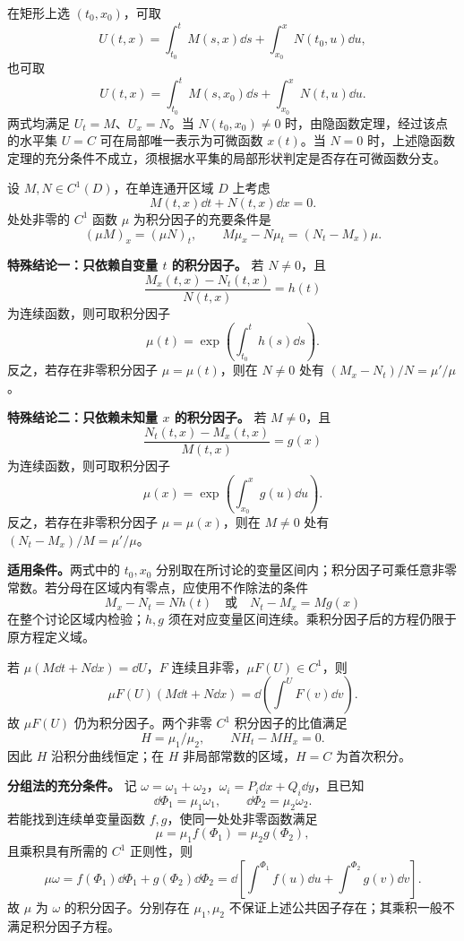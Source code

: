 在矩形上选 $(t_0,x_0)$，可取
\[
U(t,x)=\int_{t_0}^t M(s,x)\dd s+\int_{x_0}^x N(t_0,u)\dd u,
\]
也可取
\[
U(t,x)=\int_{t_0}^t M(s,x_0)\dd s+\int_{x_0}^x N(t,u)\dd u.
\]
两式均满足 $U_t=M$、$U_x=N$。当 $N(t_0,x_0)\ne0$ 时，由隐函数定理，经过该点的水平集 $U=C$ 可在局部唯一表示为可微函数 $x(t)$。当 $N=0$ 时，上述隐函数定理的充分条件不成立，须根据水平集的局部形状判定是否存在可微函数分支。

\core 设 $M,N\in C^1(D)$，在单连通开区域 $D$ 上考虑
\[
M(t,x)\dd t+N(t,x)\dd x=0.
\]
处处非零的 $C^1$ 函数 $\mu$ 为积分因子的充要条件是
\[
(\mu M)_x=(\mu N)_t,
\qquad M\mu_x-N\mu_t=(N_t-M_x)\mu.
\]

\textbf{特殊结论一：只依赖自变量 $t$ 的积分因子。}
若 $N\ne0$，且
\[
\frac{M_x(t,x)-N_t(t,x)}{N(t,x)}=h(t)
\]
为连续函数，则可取积分因子
\[
\boxed{\mu(t)=\exp\!\left(\int_{t_0}^t h(s)\dd s\right).}
\]
反之，若存在非零积分因子 $\mu=\mu(t)$，则在 $N\ne0$ 处有 $(M_x-N_t)/N=\mu'/\mu$。

\textbf{特殊结论二：只依赖未知量 $x$ 的积分因子。}
若 $M\ne0$，且
\[
\frac{N_t(t,x)-M_x(t,x)}{M(t,x)}=g(x)
\]
为连续函数，则可取积分因子
\[
\boxed{\mu(x)=\exp\!\left(\int_{x_0}^x g(u)\dd u\right).}
\]
反之，若存在非零积分因子 $\mu=\mu(x)$，则在 $M\ne0$ 处有 $(N_t-M_x)/M=\mu'/\mu$。

\textbf{适用条件。}两式中的 $t_0,x_0$ 分别取在所讨论的变量区间内；积分因子可乘任意非零常数。若分母在区域内有零点，应使用不作除法的条件
\[
M_x-N_t=N h(t)\quad\text{或}\quad N_t-M_x=M g(x)
\]
在整个讨论区域内检验；$h,g$ 须在对应变量区间连续。乘积分因子后的方程仍限于原方程定义域。

若 $\mu(M\dd t+N\dd x)=\dd U$，$F$ 连续且非零，$\mu F(U)\in C^1$，则
\[
\mu F(U)(M\dd t+N\dd x)=\dd\!\left(\int^{U}F(v)\dd v\right).
\]
故 $\mu F(U)$ 仍为积分因子。两个非零 $C^1$ 积分因子的比值满足
\[
H=\mu_1/\mu_2,\qquad NH_t-MH_x=0.
\]
因此 $H$ 沿积分曲线恒定；在 $H$ 非局部常数的区域，$H=C$ 为首次积分。


\textbf{分组法的充分条件。}
记 $\omega=\omega_1+\omega_2$，$\omega_i=P_i\dd x+Q_i\dd y$，且已知
\[
\dd\Phi_1=\mu_1\omega_1,\qquad \dd\Phi_2=\mu_2\omega_2.
\]
若能找到连续单变量函数 $f,g$，使同一处处非零函数满足
\[
\boxed{\mu=\mu_1 f(\Phi_1)=\mu_2 g(\Phi_2),}
\]
且乘积具有所需的 $C^1$ 正则性，则
\[
\mu\omega=f(\Phi_1)\dd\Phi_1+g(\Phi_2)\dd\Phi_2
=\dd\!\left[\int^{\Phi_1}f(u)\dd u+\int^{\Phi_2}g(v)\dd v\right].
\]
故 $\mu$ 为 $\omega$ 的积分因子。分别存在 $\mu_1,\mu_2$ 不保证上述公共因子存在；其乘积一般不满足积分因子方程。

